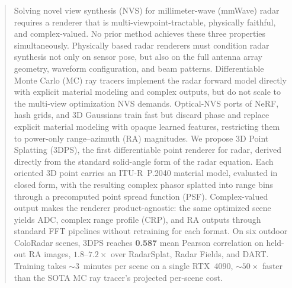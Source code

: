 \begin{abstract}
Solving novel view synthesis (NVS) for millimeter-wave (mmWave) radar requires a renderer that is multi-viewpoint-tractable, physically faithful, and complex-valued. No prior method achieves these three properties simultaneously. Physically based radar renderers must condition radar synthesis not only on sensor pose, but also on the full antenna array geometry, waveform configuration, and beam patterns. Differentiable Monte Carlo (MC) ray tracers implement the radar forward model directly with explicit material modeling and complex outputs, but do not scale to the multi-view optimization NVS demands. Optical-NVS ports of NeRF, hash grids, and 3D Gaussians train fast but discard phase and replace explicit material modeling with opaque learned features, restricting them to power-only range--azimuth (RA) magnitudes. We propose 3D Point Splatting (3DPS), the first differentiable point renderer for radar, derived directly from the standard solid-angle form of the radar equation. Each oriented 3D point carries an ITU-R~P.2040 material model, evaluated in closed form, with the resulting complex phasor splatted into range bins through a precomputed point spread function (PSF). Complex-valued output makes the renderer product-agnostic: the same optimized scene yields ADC, complex range profile (CRP), and RA outputs through standard FFT pipelines without retraining for each format. On six outdoor ColoRadar scenes, 3DPS reaches \textbf{0.587} mean Pearson correlation on held-out RA images, $1.8$--$7.2\times$ over RadarSplat, Radar Fields, and DART. Training takes ${\sim}3$~minutes per scene on a single RTX~4090, ${\sim}50\times$ faster than the SOTA MC ray tracer's projected per-scene cost.
\end{abstract}
